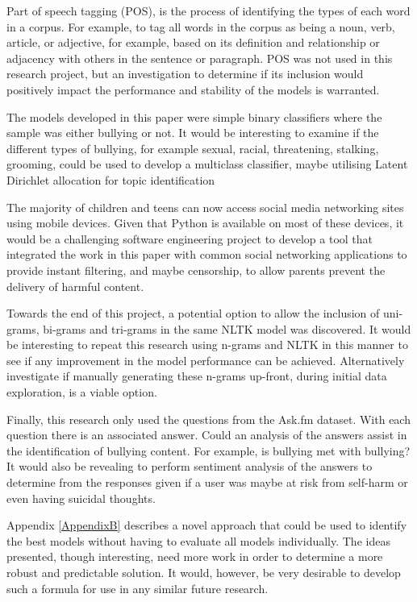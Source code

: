Part of speech tagging (POS), is the process of identifying the types of each word in a corpus. For example, to tag all words in the corpus as being a noun, verb, article, or adjective, for example, based on its definition and relationship or adjacency with others in the sentence or paragraph. POS was not used in this research project, but an investigation to determine if its inclusion would positively impact the performance and stability of the models is warranted.

The models developed in this paper were simple binary classifiers where the sample was either bullying or not. It would be interesting to examine if the different types of bullying, for example sexual, racial, threatening, stalking, grooming, could be used to develop a multiclass classifier, maybe utilising Latent Dirichlet allocation for topic identification

The majority of children and teens can now access social media networking sites using mobile devices. Given that Python is available on most of these devices, it would be a challenging software engineering project to develop a tool that integrated the work in this paper with common social networking applications to provide instant filtering, and maybe censorship, to allow parents prevent the delivery of harmful content.

Towards the end of this project, a potential option to allow the inclusion of uni-grams, bi-grams and tri-grams in the same NLTK model was discovered. It would be interesting to repeat this research using n-grams and NLTK in this manner to see if any improvement in the model performance can be achieved. Alternatively investigate if manually generating these n-grams up-front, during initial data exploration, is a viable option.

Finally, this research only used the questions from the Ask.fm dataset. With each question there is an associated answer. Could an analysis of the answers assist in the identification of bullying content. For example, is bullying met with bullying? It would also be revealing to perform sentiment analysis of the answers to determine from the responses given if a user was maybe at risk from self-harm or even having suicidal thoughts.

Appendix \ref{AppendixB} describes a novel approach that could be used to identify the best models without having to evaluate all models individually. The ideas presented, though interesting, need more work in order to determine a more robust and predictable solution. It would, however, be very desirable to develop such a formula for use in any similar future research.

